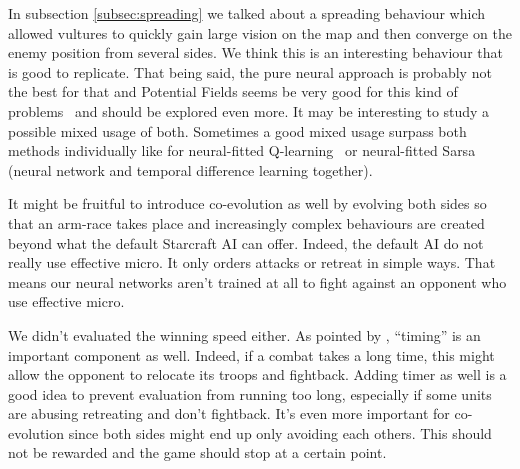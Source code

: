 In subsection \ref{subsec:spreading} we talked about a spreading behaviour which
allowed vultures to quickly gain large vision on the map and then converge on the enemy
position from several sides. We think this is an interesting behaviour that is good
to replicate. That being said, the pure neural approach is probably not the best for that and
Potential Fields seems be very good for this kind of problems~\cite{Hagelback08RTSPotentialFields, Svendsen12SCPotentialFieldsGP}
and should be explored even more. It may be interesting to study a possible mixed usage of both.
Sometimes a good mixed usage surpass both methods individually like for neural-fitted
Q-learning~\cite{Riedmiller05NeuralFittedQ} or neural-fitted Sarsa~\cite{Shantia11ConnectionistSC}
(neural network and temporal difference learning together).

It might be fruitful to introduce co-evolution as well by evolving
both sides so that an arm-race takes place and increasingly complex
behaviours are created beyond what the default Starcraft AI can offer.
Indeed, the default AI do not really use effective micro. It only
orders attacks or retreat in simple ways. That means our neural networks
aren't trained at all to fight against an opponent who use effective micro.

We didn't evaluated the winning speed either. As pointed by \citet{Liu14EffectiveMicro},
``timing'' is an important component as well. Indeed, if a combat takes a long time,
this might allow the opponent to relocate its troops and fightback.
Adding timer as well is a good idea to prevent evaluation from running too long,
especially if some units are abusing retreating and don't fightback. It's even more
important for co-evolution since both sides might end up only avoiding each others.
This should not be rewarded and the game should stop at a certain point.
